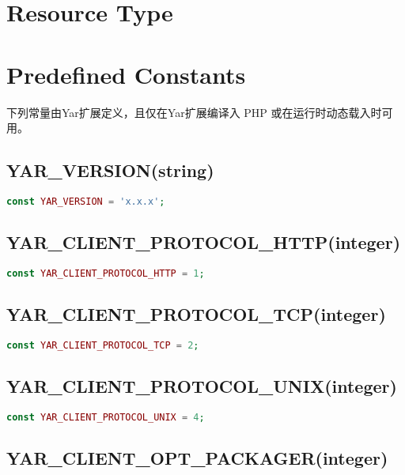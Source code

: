 \section{Resource Type}


\section{Predefined Constants}


下列常量由Yar扩展定义，且仅在Yar扩展编译入 PHP 或在运行时动态载入时可用。


\subsection{YAR\_VERSION(string)}

\begin{lstlisting}[language=PHP]
const YAR_VERSION = 'x.x.x';
\end{lstlisting}

\subsection{YAR\_CLIENT\_PROTOCOL\_HTTP(integer)}

\begin{lstlisting}[language=PHP]
const YAR_CLIENT_PROTOCOL_HTTP = 1;
\end{lstlisting}

\subsection{YAR\_CLIENT\_PROTOCOL\_TCP(integer)}

\begin{lstlisting}[language=PHP]
const YAR_CLIENT_PROTOCOL_TCP = 2;
\end{lstlisting}

\subsection{YAR\_CLIENT\_PROTOCOL\_UNIX(integer)}

\begin{lstlisting}[language=PHP]
const YAR_CLIENT_PROTOCOL_UNIX = 4;
\end{lstlisting}



\subsection{YAR\_CLIENT\_OPT\_PACKAGER(integer)}

